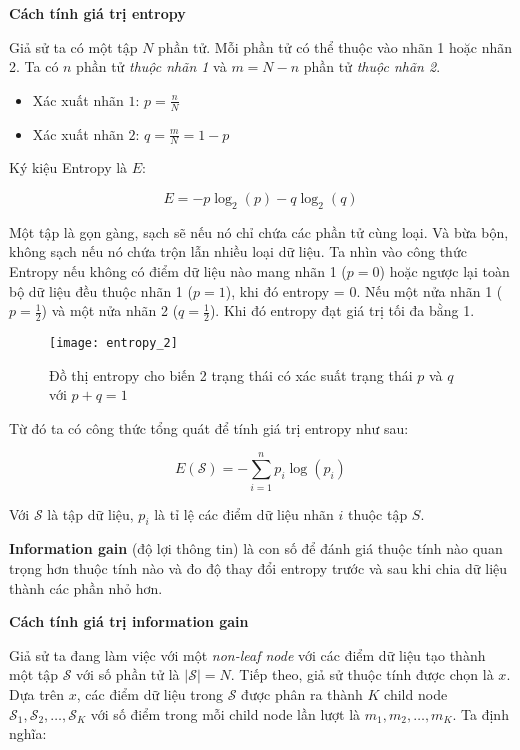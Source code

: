 \documentclass[../main-report.tex]{subfiles}
\begin{document}
\textbf{Cách tính giá trị entropy}

Giả sử ta có một tập $N$ phần tử. Mỗi phần tử có thể thuộc vào nhãn 1 hoặc nhãn 2. Ta có $n$ phần tử \emph{thuộc nhãn 1} và $m = N - n$ phần tử \emph{thuộc nhãn 2}. 

\begin{itemize}
\item Xác xuất nhãn $1$: $p = \frac{n}{N}$
\item Xác xuất nhãn $2$: $q = \frac{m}{N} = 1 - p $
\end{itemize}

Ký kiệu Entropy là $E$:

\begin{equation}
E = -p\log _2(p) - q\log _2(q)
\end{equation}

Một tập là gọn gàng, sạch sẽ nếu nó chỉ chứa các phần tử cùng loại. Và bừa bộn, không sạch nếu nó chứa trộn lẫn nhiều loại dữ liệu. Ta nhìn vào công thức Entropy nếu không có điểm dữ liệu nào mang nhãn 1 ($p = 0$) hoặc ngược lại toàn bộ dữ liệu đều thuộc nhãn 1 ($p = 1$), khi đó entropy = 0. Nếu một nửa nhãn 1 ($p =  \frac{1}{2}$) và một nửa nhãn 2 ($ q = \frac{1}{2}$). Khi đó entropy đạt giá trị tối đa bằng 1.

\begin{figure}[ht!]
\centering\texttt{[image: entropy\_2]}
\caption[Đồ thị entropy cho biến 2 trạng thái]{Đồ thị entropy cho biến 2 trạng thái có xác suất trạng thái $p$ và $q$ với $p + q = 1$}
\label{fig:entropy_2}
\end{figure}

Từ đó ta có công thức tổng quát để tính giá trị entropy như sau:

\begin{equation}
E(\mathcal{S}) = -\sum_{i=1}^n p_i \log(p_i)
\end{equation}

Với $\mathcal{S}$ là tập dữ liệu, $p_i$ là tỉ lệ các điểm dữ liệu nhãn $i$ thuộc tập $S$.

\textbf{Information gain} (độ lợi thông tin)  là con số để đánh giá thuộc tính nào quan trọng hơn thuộc tính nào và đo độ thay đổi entropy trước và sau khi chia dữ liệu thành các phần nhỏ hơn.

\textbf{Cách tính giá trị information gain}

Giả sử ta đang làm việc với một \emph{non-leaf node} với các điểm dữ liệu tạo thành một tập \(\mathcal{S}\) với số phần tử là \(|\mathcal{S}| = N\). Tiếp theo, giả sử thuộc tính được chọn là \(x\). Dựa trên \(x\), các điểm dữ liệu trong \(\mathcal{S}\) được phân ra thành \(K\) child node \(\mathcal{S}_1, \mathcal{S}_2, \dots, \mathcal{S}_K\) với số điểm trong mỗi child node lần lượt là \(m_1, m_2, \dots, m_K\). Ta định nghĩa:
\end{document}

